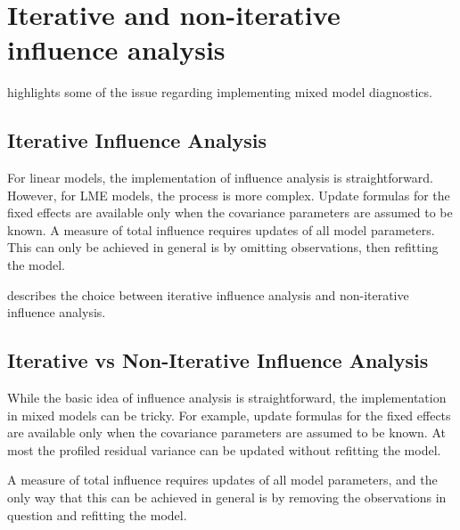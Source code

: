 \documentclass[12pt, a4paper]{article}
\begin{document}
	\newpage
	\section{Iterative and non-iterative influence analysis} %
	\citet{schab} highlights some of the issue regarding implementing mixed model diagnostics.
	
	
	\subsection{Iterative Influence Analysis}
	
	For linear models, the implementation of influence analysis is straightforward.
	However, for LME models, the process is more complex. Update formulas for the fixed effects are available only when the covariance parameters are assumed to be known. A measure of total influence requires updates of all model parameters.
	This can only be achieved in general is by omitting observations, then refitting the model.
	
	\citet{schab} describes the choice between  iterative influence analysis and  non-iterative influence analysis.
	
	
	
	
	
	\subsection{Iterative vs Non-Iterative Influence Analysis}
	While the basic idea of influence analysis is straightforward, the implementation in mixed models can be
	tricky. For example, update formulas for the fixed effects are available only when the covariance parameters
	are assumed to be known. At most the profiled residual variance can be updated without refitting the model.
	
	A measure of total influence requires updates of all model parameters, and the only way that this can be
	achieved in general is by removing the observations in question and refitting the model. 
	
\end{document}
